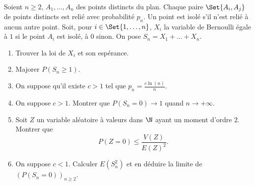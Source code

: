 \begin{enonce}
\begin{exercise}[ID={RMS130 E750},subtitle={Mines-Ponts PSI 2019},tags={}, difficulty={0}]
Soient $n\geq 2$, $A_1,\dots,A_n$ des points distincts du plan.
  Chaque paire $\Set{A_i,A_j}$ de points distincts est relié avec probabilité $p_n$.
  Un point est isolé s'il n'est relié à aucun autre point.
  Soit, pour $i\in\Set{1,\dots,n}$, $X_i$ la variable de Bernoulli égale à $1$ si le point $A_i$ est isolé, à $0$ sinon.
  On pose $S_n = X_1 + \dots + X_n$.

  \begin{enumerate}
    \item Trouver la loi de $X_i$ et son espérance.
    \item Majorer $P(S_n\geq 1)$.

    \item[]    On suppose qu'il existe $c>1$ tel que $p_n = \frac{c\ln(n)}{n}$.

    \item On suppose $c>1$. Montrer que $P(S_n=0)\to 1$ quand $n\to+\infty$.

    \item Soit $Z$ un variable aléatoire à valeurs dans $\N$ ayant un moment d'ordre $2$.
      Montrer que
      \begin{equation*}
      P(Z=0)\leq \frac{V(Z)}{E(Z)^2}.
      \end{equation*}

    \item On suppose $c<1$.
      Calculer $E(S_n^2)$ et en déduire la limite de $\left( P(S_n=0) \right)_{n\geq2}$.
  \end{enumerate}
\end{exercise}
\begin{solution}
\end{solution}
\end{enonce}
